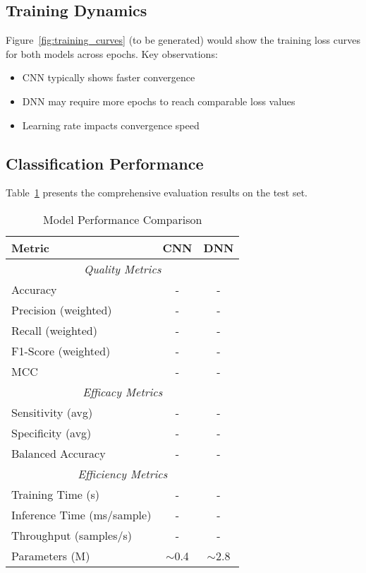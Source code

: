 \documentclass[runningheads]{llncs}
\begin{document}
\subsection{Training Dynamics}

Figure~\ref{fig:training_curves} (to be generated) would show the training loss curves for both models across epochs. Key observations:

\begin{itemize}
    \item CNN typically shows faster convergence
    \item DNN may require more epochs to reach comparable loss values
    \item Learning rate impacts convergence speed
\end{itemize}

\subsection{Classification Performance}

Table~\ref{tab:results} presents the comprehensive evaluation results on the test set.

\begin{table}[htbp]
\centering
\caption{Model Performance Comparison}
\label{tab:results}
\begin{tabular}{lcc}
\toprule
\textbf{Metric} & \textbf{CNN} & \textbf{DNN} \\
\midrule
\multicolumn{3}{c}{\textit{Quality Metrics}} \\
Accuracy & - & - \\
Precision (weighted) & - & - \\
Recall (weighted) & - & - \\
F1-Score (weighted) & - & - \\
MCC & - & - \\
\midrule
\multicolumn{3}{c}{\textit{Efficacy Metrics}} \\
Sensitivity (avg) & - & - \\
Specificity (avg) & - & - \\
Balanced Accuracy & - & - \\
\midrule
\multicolumn{3}{c}{\textit{Efficiency Metrics}} \\
Training Time (s) & - & - \\
Inference Time (ms/sample) & - & - \\
Throughput (samples/s) & - & - \\
Parameters (M) & $\sim$0.4 & $\sim$2.8 \\
\bottomrule
\end{tabular}
\end{table}
\end{document}
